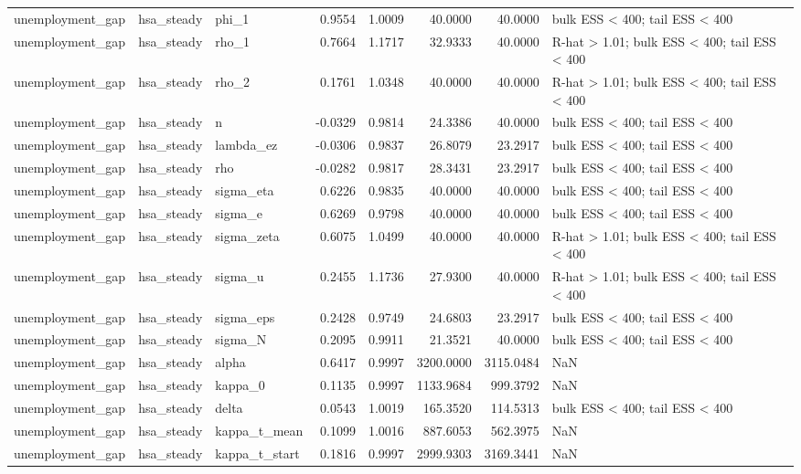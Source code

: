 \begin{tabular}{lllrrrrl}
unemployment\_gap & hsa\_steady & phi\_1 & 0.9554 & 1.0009 & 40.0000 & 40.0000 & bulk ESS < 400; tail ESS < 400 \\
unemployment\_gap & hsa\_steady & rho\_1 & 0.7664 & 1.1717 & 32.9333 & 40.0000 & R-hat > 1.01; bulk ESS < 400; tail ESS < 400 \\
unemployment\_gap & hsa\_steady & rho\_2 & 0.1761 & 1.0348 & 40.0000 & 40.0000 & R-hat > 1.01; bulk ESS < 400; tail ESS < 400 \\
unemployment\_gap & hsa\_steady & n & -0.0329 & 0.9814 & 24.3386 & 40.0000 & bulk ESS < 400; tail ESS < 400 \\
unemployment\_gap & hsa\_steady & lambda\_ez & -0.0306 & 0.9837 & 26.8079 & 23.2917 & bulk ESS < 400; tail ESS < 400 \\
unemployment\_gap & hsa\_steady & rho & -0.0282 & 0.9817 & 28.3431 & 23.2917 & bulk ESS < 400; tail ESS < 400 \\
unemployment\_gap & hsa\_steady & sigma\_eta & 0.6226 & 0.9835 & 40.0000 & 40.0000 & bulk ESS < 400; tail ESS < 400 \\
unemployment\_gap & hsa\_steady & sigma\_e & 0.6269 & 0.9798 & 40.0000 & 40.0000 & bulk ESS < 400; tail ESS < 400 \\
unemployment\_gap & hsa\_steady & sigma\_zeta & 0.6075 & 1.0499 & 40.0000 & 40.0000 & R-hat > 1.01; bulk ESS < 400; tail ESS < 400 \\
unemployment\_gap & hsa\_steady & sigma\_u & 0.2455 & 1.1736 & 27.9300 & 40.0000 & R-hat > 1.01; bulk ESS < 400; tail ESS < 400 \\
unemployment\_gap & hsa\_steady & sigma\_eps & 0.2428 & 0.9749 & 24.6803 & 23.2917 & bulk ESS < 400; tail ESS < 400 \\
unemployment\_gap & hsa\_steady & sigma\_N & 0.2095 & 0.9911 & 21.3521 & 40.0000 & bulk ESS < 400; tail ESS < 400 \\
unemployment\_gap & hsa\_steady & alpha & 0.6417 & 0.9997 & 3200.0000 & 3115.0484 & NaN \\
unemployment\_gap & hsa\_steady & kappa\_0 & 0.1135 & 0.9997 & 1133.9684 & 999.3792 & NaN \\
unemployment\_gap & hsa\_steady & delta & 0.0543 & 1.0019 & 165.3520 & 114.5313 & bulk ESS < 400; tail ESS < 400 \\
unemployment\_gap & hsa\_steady & kappa\_t\_mean & 0.1099 & 1.0016 & 887.6053 & 562.3975 & NaN \\
unemployment\_gap & hsa\_steady & kappa\_t\_start & 0.1816 & 0.9997 & 2999.9303 & 3169.3441 & NaN \\

\end{tabular}
